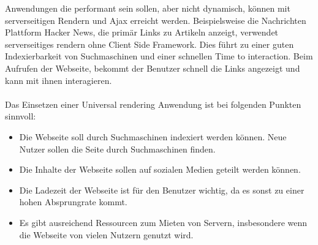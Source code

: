 \documentclass[runningheads]{llncs}
\begin{document}
Anwendungen die performant sein sollen, 
aber nicht dynamisch, können mit serverseitigen Rendern und 
Ajax erreicht werden. Beispielsweise die Nachrichten Plattform Hacker News, 
die primär Links zu Artikeln anzeigt, 
verwendet serverseitiges rendern ohne Client Side Framework. 
Dies führt zu einer guten Indexierbarkeit von Suchmaschinen und 
einer schnellen Time to interaction. Beim Aufrufen der Webseite, 
bekommt der Benutzer schnell die Links angezeigt und 
kann mit ihnen interagieren. 
\\
\\
Das Einsetzen einer Universal rendering Anwendung ist bei folgenden Punkten sinnvoll: 
\begin{itemize}
  \setlength\itemsep{1em}
  \item Die Webseite soll durch Suchmaschinen indexiert werden können. 
    Neue Nutzer sollen die Seite durch Suchmaschinen finden.
  \item Die Inhalte der Webseite sollen auf sozialen Medien geteilt werden können. 
  \item Die Ladezeit der Webseite ist für den Benutzer wichtig, 
  da es sonst zu einer hohen Absprungrate kommt.
  \item Es gibt ausreichend Ressourcen zum Mieten von Servern, 
  insbesondere wenn die Webseite von vielen Nutzern genutzt wird. 
\end{itemize}
\end{document}

